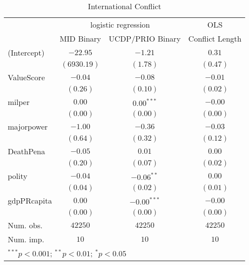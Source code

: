 
\begin{table}
\begin{center}
\begin{tabular}{l c c c}
\hline
 & \multicolumn{2}{c}{logistic regression} & \multicolumn{1}{c}{OLS} \\
\cline{2-3} \cline{4-4}
 & MID Binary & UCDP/PRIO Binary & Conflict Length \\
\hline
(Intercept) & $-22.95$    & $-1.21$       & $0.31$   \\
            & $(6930.19)$ & $(1.78)$      & $(0.47)$ \\
ValueScore  & $-0.04$     & $-0.08$       & $-0.01$  \\
            & $(0.26)$    & $(0.10)$      & $(0.02)$ \\
milper      & $0.00$      & $0.00^{***}$  & $-0.00$  \\
            & $(0.00)$    & $(0.00)$      & $(0.00)$ \\
majorpower  & $-1.00$     & $-0.36$       & $-0.03$  \\
            & $(0.64)$    & $(0.32)$      & $(0.12)$ \\
DeathPena   & $-0.05$     & $0.01$        & $0.00$   \\
            & $(0.20)$    & $(0.07)$      & $(0.02)$ \\
polity      & $-0.04$     & $-0.06^{**}$  & $0.00$   \\
            & $(0.04)$    & $(0.02)$      & $(0.01)$ \\
gdpPRcapita & $0.00$      & $-0.00^{***}$ & $-0.00$  \\
            & $(0.00)$    & $(0.00)$      & $(0.00)$ \\
\hline
Num. obs.   & $42250$     & $42250$       & $42250$  \\
Num. imp.   & $10$        & $10$          & $10$     \\
\hline
\multicolumn{4}{l}{\scriptsize{$^{***}p<0.001$; $^{**}p<0.01$; $^{*}p<0.05$}}
\end{tabular}
\caption{International Conflict}
\label{Frreg}
\end{center}
\end{table}
